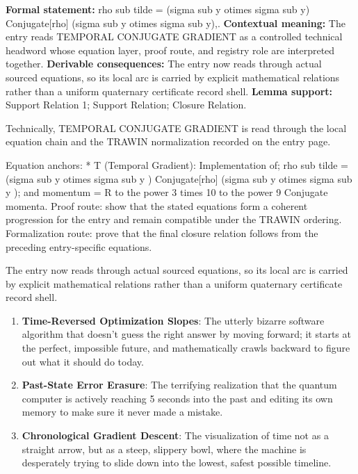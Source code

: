 \begingroup\footnotesize\setlength{\emergencystretch}{3em}\sloppy
\textbf{Formal statement:} rho sub tilde = (sigma sub y otimes sigma sub y) Conjugate[rho] (sigma sub y otimes sigma sub y),. \textbf{Contextual meaning:} The entry reads TEMPORAL CONJUGATE GRADIENT as a controlled technical headword whose equation layer, proof route, and registry role are interpreted together. \textbf{Derivable consequences:} The entry now reads through actual sourced equations, so its local arc is carried by explicit mathematical relations rather than a uniform quaternary certificate record shell. \textbf{Lemma support:} Support Relation 1; Support Relation; Closure Relation.\par
\endgroup

Technically, TEMPORAL CONJUGATE GRADIENT is read through the local equation chain and the TRAWIN normalization recorded on the entry page.

Equation anchors: * T (Temporal Gradient): Implementation of; rho sub tilde = (sigma sub y otimes sigma sub y ) Conjugate[rho] (sigma sub y otimes sigma sub y ); and momentum = R to the power 3 times 10 to the power 9 Conjugate momenta. Proof route: show that the stated equations form a coherent progression for the entry and remain compatible under the TRAWIN ordering. Formalization route: prove that the final closure relation follows from the preceding entry-specific equations.

The entry now reads through actual sourced equations, so its local arc is carried by explicit mathematical relations rather than a uniform quaternary certificate record shell.
\endgroup

\begin{enumerate}[leftmargin=1.6em,itemsep=6pt,topsep=4pt]
\item \textbf{Time-Reversed Optimization Slopes}: The utterly bizarre software algorithm that doesn't guess the right answer by moving forward; it starts at the perfect, impossible future, and mathematically crawls backward to figure out what it should do today.
\item \textbf{Past-State Error Erasure}: The terrifying realization that the quantum computer is actively reaching 5 seconds into the past and editing its own memory to make sure it never made a mistake.
\item \textbf{Chronological Gradient Descent}: The visualization of time not as a straight arrow, but as a steep, slippery bowl, where the machine is desperately trying to slide down into the lowest, safest possible timeline.
\end{enumerate}

